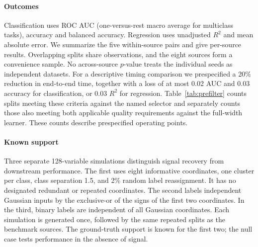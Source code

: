 \paragraph{Outcomes}
Classification uses ROC AUC (one-versus-rest macro average for multiclass tasks), accuracy and balanced accuracy. Regression uses unadjusted $R^2$ and mean absolute error. We summarize the five within-source pairs and give per-source results. Overlapping splits share observations, and the eight sources form a convenience sample. No across-source $p$-value treats the individual seeds as independent datasets. For a descriptive timing comparison we prespecified a 20\% reduction in end-to-end time, together with a loss of at most 0.02 AUC and 0.03 accuracy for classification, or 0.03 $R^2$ for regression. Table~\ref{tab:prefilter} counts splits meeting these criteria against the named selector and separately counts those also meeting both applicable quality requirements against the full-width learner. These counts describe prespecified operating points.

\paragraph{Known support}
Three separate 128-variable simulations distinguish signal recovery from downstream performance. The first uses eight informative coordinates, one cluster per class, class separation 1.5, and 2\% random label reassignment. It has no designated redundant or repeated coordinates. The second labels independent Gaussian inputs by the exclusive-or of the signs of the first two coordinates. In the third, binary labels are independent of all Gaussian coordinates. Each simulation is generated once, followed by the same repeated splits as the benchmark sources. The ground-truth support is known for the first two; the null case tests performance in the absence of signal.
